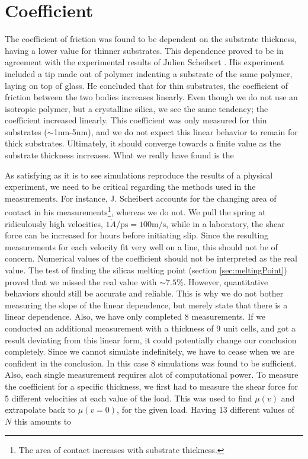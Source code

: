 \documentclass[twoside,english]{uiofysmaster}
\begin{document}
\section{Coefficient}
The coefficient of friction was found to be dependent on the substrate thickness, having a lower value for thinner substrates. 
This dependence proved to be in agreement with the experimental results of Julien Scheibert \cite{Scheibert2017}. 
His experiment included a tip made out of polymer indenting a substrate of the same polymer, laying on top of glass.
He concluded that for thin substrates, the coefficient of friction between the two bodies increases linearly. 
Even though we do not use an isotropic polymer, but a crystalline silica, we see the same tendency; 
the coefficient increased linearly. 
This coefficient was only measured for thin substrates ($\sim$1nm-5nm), and we do not expect this linear behavior to remain for thick substrates. 
Ultimately, it should converge towards a finite value as the substrate thickness increases.
What we really have found is the 



As satisfying as it is to see simulations reproduce the results of a physical experiment, we need to be critical regarding the methods used in the measurements.
For instance, J. Scheibert accounts for the changing area of contact in his measurements\footnote{The area of contact increases with substrate thickness.}, whereas we do not.
We pull the spring at ridiculously high velocities, $1\mathring{A}/\text{ps} = 100\text{m/s}$, while in a laboratory, the shear force can be increased for hours before initiating slip. 
Since the resulting measurements for each velocity fit very well on a line, this should not be of concern. 
Numerical values of the coefficient should not be interpreted as the real value. 
The test of finding the silicas melting point (section \ref{sec:meltingPoint}) proved that we missed the real value with $\sim 7.5\%$.
However, quantitative behaviors should still be accurate and reliable.
This is why we do not bother measuring the slope of the linear dependence, but merely state that there is a linear dependence.   
Also, we have only completed 8 measurements. 
If we conducted an additional measurement with a thickness of 9 unit cells, and got a result deviating from this linear form, it could potentially change our conclusion completely. 
Since we cannot simulate indefinitely, we have to cease when we are confident in the conclusion.  
In this case 8 simulations was found to be sufficient. 
Also, each single measurement requires alot of computational power. 
To measure the coefficient for a specific thickness, we first had to measure the shear force for 5 different velocities at each value of the load. 
This was used to find $\mu(v)$ and extrapolate back to $\mu(v=0)$, for the given load. 
Having 13 different values of $N$ this amounts to 
\end{document}

